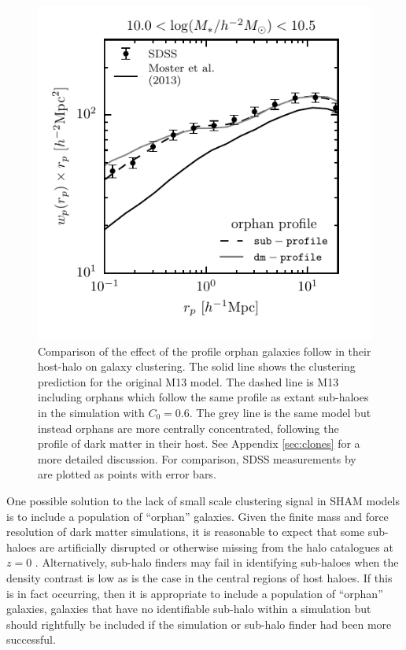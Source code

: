 \documentclass[useAMS,fleqn,usenatbib]{mnras}
\begin{document}
\begin{figure}
    \includegraphics[width=\columnwidth]{figures/wp_comparison_clone_profile_2.pdf}
    \caption{Comparison of the effect of the profile orphan galaxies follow in their host-halo on galaxy clustering.  The solid line shows the clustering prediction for the original M13 model.  The dashed line is M13 including orphans which follow the same profile as extant sub-haloes in the simulation with $C_0=0.6$.  The grey line is the same model but instead orphans are more centrally concentrated, following the profile of dark matter in their host.  See Appendix \ref{sec:clones} for a more detailed discussion.  For comparison, SDSS measurements by \citet{Yang:2012ew} are plotted as points with error bars.}
    \label{fig:orphan_clustering_2}
\end{figure}

One possible solution to the lack of small scale clustering signal in SHAM models is to include a population of ``orphan'' galaxies.  Given the finite mass and force resolution of dark matter simulations, it is reasonable to expect that some sub-haloes are artificially disrupted or otherwise missing from the halo catalogues at $z=0$ \citep[][van den Bosch 2017 in prep.]{Carlberg:1994kl, vanKampen:1995ix, Guo:2013fm}.  Alternatively, sub-halo finders may fail in identifying sub-haloes when the density contrast is low \citep{Wetzel:2010ei, Muldrew:2011gr, Knebe:2011jc, Onions:2012iv, Knebe:2013bp, vandenBosch:2016ky} as is the case in the central regions of host haloes.  If this is in fact occurring, then it is appropriate to include a population of ``orphan'' galaxies, galaxies that have no identifiable sub-halo within a simulation but should rightfully be included if the simulation or sub-halo finder had been more successful.       
\end{document}
